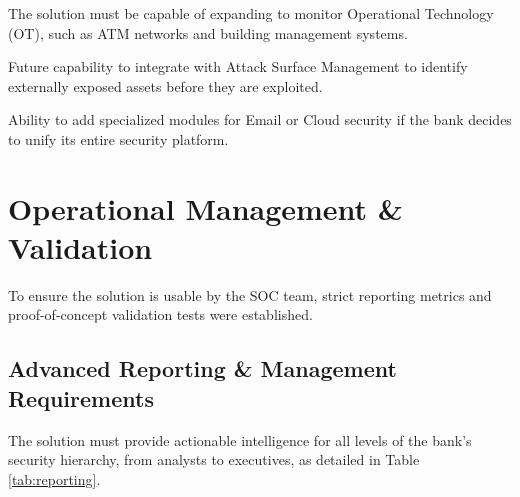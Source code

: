 \documentclass[12pt,a4paper]{report}
\begin{document}
\begin{description}[leftmargin=1.5cm, labelindent=0.5cm, style=nextline]
  \item[\textbf{OT/IoT Coverage}]
    The solution must be capable of expanding to monitor Operational Technology (OT),
    such as ATM networks and building management systems.

  \item[\textbf{Proactive Defense Integration}]
    Future capability to integrate with Attack Surface Management to identify externally
    exposed assets before they are exploited.

  \item[\textbf{Modular Expansion}]
    Ability to add specialized modules for Email or Cloud security if the bank decides to
    unify its entire security platform.
\end{description}

\section{Operational Management \& Validation}
To ensure the solution is usable by the SOC team, strict reporting metrics and proof-of-concept validation tests were established.


\subsection{Advanced Reporting \& Management Requirements}

The solution must provide actionable intelligence for all levels of the bank's security
hierarchy, from analysts to executives, as detailed in Table \ref{tab:reporting}.

\captionsetup{singlelinecheck=false, justification=raggedright}
\renewcommand{\arraystretch}{1.4}
\end{document}
